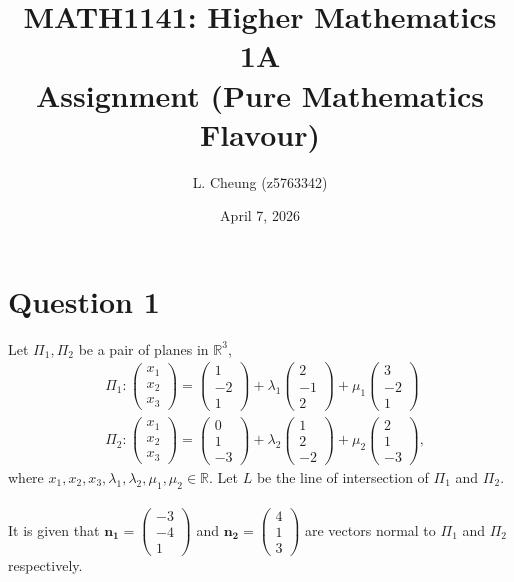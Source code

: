 \documentclass{amsart}
\title{%
	MATH1141: Higher Mathematics 1A \\
	Assignment (Pure Mathematics Flavour)}
\author{L. Cheung (z5763342)}
\date{April 7, 2026}
\renewcommand{\vec}{\mathbf}
\newcommand{\cvec}[1]{ \begin{pmatrix} #1 \end{pmatrix} }
\begin{document}
\maketitle

\section*{\LARGE{Question 1}}
Let $\Pi_1, \Pi_2$ be a pair of planes in $\mathbb{R}^3$,
	\begin{align*}
		& \Pi_1 : \cvec{x_1\\x_2\\x_3} = \cvec{1\\-2\\1} + \lambda_1 \cvec{2\\-1\\2} + \mu_1 \cvec{3\\-2\\1}	\\
		& \Pi_2 : \cvec{x_1\\x_2\\x_3} = \cvec{0\\1\\-3} + \lambda_2 \cvec{1\\2\\-2} + \mu_2 \cvec{2\\1\\-3},
	\end{align*}
where $x_1,x_2,x_3,\lambda_1,\lambda_2,\mu_1,\mu_2 \in \mathbb{R}$. Let $L$ be the line of intersection of $\Pi_1$ and $\Pi_2$.
\\ \\
It is given that $\vec{n_1} = \cvec{-3\\-4\\1}$ and $\vec{n_2} = \cvec{4\\1\\3}$ are vectors normal to $\Pi_1$ and $\Pi_2$ respectively.
\end{document}
